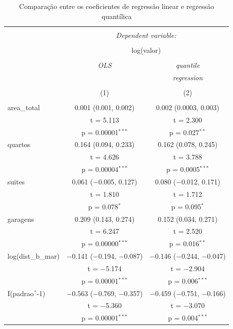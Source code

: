 \documentclass[a4paper, 12pt]{article}
\begin{document}
\begin{table}[!htbp] \centering 
  \caption{Comparação entre os coeficientes de regressão linear e regressão quantílica} 
  \label{tab:fit} 
\begin{tabular}{@{\extracolsep{5pt}}lcc} 
\\[-1.8ex]\hline 
\hline \\[-1.8ex] 
 & \multicolumn{2}{c}{\textit{Dependent variable:}} \\ 
\cline{2-3} 
\\[-1.8ex] & \multicolumn{2}{c}{log(valor)} \\ 
\\[-1.8ex] & \textit{OLS} & \textit{quantile} \\ 
 & \textit{} & \textit{regression} \\ 
\\[-1.8ex] & (1) & (2)\\ 
\hline \\[-1.8ex] 
 area\_total & 0.001 (0.001, 0.002) & 0.002 (0.0003, 0.003) \\ 
  & t = 5.113 & t = 2.300 \\ 
  & p = 0.00001$^{***}$ & p = 0.027$^{**}$ \\ 
  quartos & 0.164 (0.094, 0.233) & 0.162 (0.078, 0.245) \\ 
  & t = 4.626 & t = 3.788 \\ 
  & p = 0.00004$^{***}$ & p = 0.0005$^{***}$ \\ 
  suites & 0.061 ($-$0.005, 0.127) & 0.080 ($-$0.012, 0.171) \\ 
  & t = 1.810 & t = 1.712 \\ 
  & p = 0.078$^{*}$ & p = 0.095$^{*}$ \\ 
  garagens & 0.209 (0.143, 0.274) & 0.152 (0.034, 0.271) \\ 
  & t = 6.247 & t = 2.520 \\ 
  & p = 0.00000$^{***}$ & p = 0.016$^{**}$ \\ 
  log(dist\_b\_mar) & $-$0.141 ($-$0.194, $-$0.087) & $-$0.146 ($-$0.244, $-$0.047) \\ 
  & t = $-$5.174 & t = $-$2.904 \\ 
  & p = 0.00001$^{***}$ & p = 0.006$^{***}$ \\ 
  I(padrao$\hat{\mkern6mu}$-1) & $-$0.563 ($-$0.769, $-$0.357) & $-$0.459 ($-$0.751, $-$0.166) \\ 
  & t = $-$5.360 & t = $-$3.070 \\ 
  & p = 0.00001$^{***}$ & p = 0.004$^{***}$ \\ 

\end{tabular}
\end{table}
\end{document}

